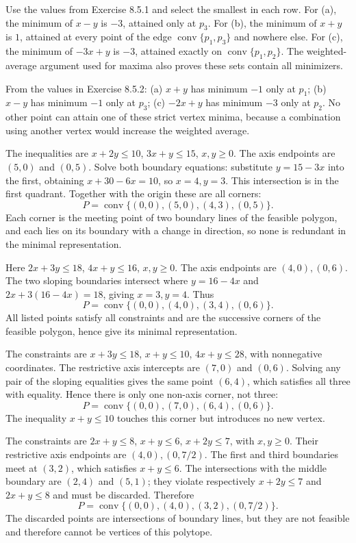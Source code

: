 Use the values from Exercise 8.5.1 and select the smallest in each row.
For (a), the minimum of $x-y$ is $-3$, attained only at $p_3$.
For (b), the minimum of $x+y$ is $1$, attained at every point of the edge
$\operatorname{conv}\{p_1,p_3\}$ and nowhere else.
For (c), the minimum of $-3x+y$ is $-3$, attained exactly on
$\operatorname{conv}\{p_1,p_2\}$.
The weighted-average argument used for maxima also proves these sets contain all minimizers.

From the values in Exercise 8.5.2:
(a) $x+y$ has minimum $-1$ only at $p_1$;
(b) $x-y$ has minimum $-1$ only at $p_3$;
(c) $-2x+y$ has minimum $-3$ only at $p_2$.
No other point can attain one of these strict vertex minima, because a
combination using another vertex would increase the weighted average.

The inequalities are $x+2y\le10$, $3x+y\le15$, $x,y\ge0$.
The axis endpoints are $(5,0)$ and $(0,5)$. Solve both boundary equations:
substitute $y=15-3x$ into the first, obtaining $x+30-6x=10$,
so $x=4,y=3$. This intersection is in the first quadrant.
Together with the origin these are all corners:
\[
 P=\operatorname{conv}\{(0,0),(5,0),(4,3),(0,5)\}.
\]
Each corner is the meeting point of two boundary lines of the feasible
polygon, and each lies on its boundary with a change in direction, so none
is redundant in the minimal representation.

Here $2x+3y\le18$, $4x+y\le16$, $x,y\ge0$.
The axis endpoints are $(4,0),(0,6)$.
The two sloping boundaries intersect where $y=16-4x$ and
$2x+3(16-4x)=18$, giving $x=3,y=4$.
Thus
\[
 P=\operatorname{conv}\{(0,0),(4,0),(3,4),(0,6)\}.
\]
All listed points satisfy all constraints and are the successive corners
of the feasible polygon, hence give its minimal representation.

The constraints are $x+3y\le18$, $x+y\le10$, $4x+y\le28$,
with nonnegative coordinates. The restrictive axis intercepts are $(7,0)$
and $(0,6)$. Solving any pair of the sloping equalities gives the same
point $(6,4)$, which satisfies all three with equality.
Hence there is only one non-axis corner, not three:
\[
 P=\operatorname{conv}\{(0,0),(7,0),(6,4),(0,6)\}.
\]
The inequality $x+y\le10$ touches this corner but introduces no new vertex.

The constraints are $2x+y\le8$, $x+y\le6$, $x+2y\le7$,
with $x,y\ge0$. Their restrictive axis endpoints are $(4,0),(0,7/2)$.
The first and third boundaries meet at $(3,2)$, which satisfies $x+y\le6$.
The intersections with the middle boundary are $(2,4)$ and $(5,1)$;
they violate respectively $x+2y\le7$ and $2x+y\le8$ and must be discarded.
Therefore
\[
 P=\operatorname{conv}\{(0,0),(4,0),(3,2),(0,7/2)\}.
\]
The discarded points are intersections of boundary lines, but they are
not feasible and therefore cannot be vertices of this polytope.

